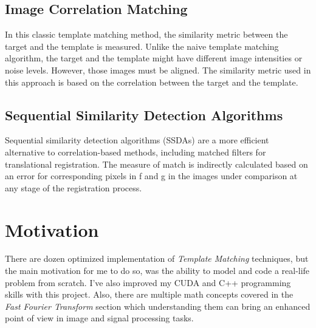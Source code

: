 \subsection{Image Correlation Matching}
In this classic template matching method, the similarity
metric between the target and the template is measured.
Unlike the naive template matching algorithm, the target and the template might have different image intensities or
noise levels. However, those images must be aligned. The
similarity metric used in this approach is based on the
correlation between the target and the template\cite{intro2}.

\subsection{Sequential Similarity Detection Algorithms}
Sequential similarity detection algorithms (SSDAs) are
a more efficient alternative to correlation-based methods,
including matched filters for translational registration. The
measure of match is indirectly calculated based on an error
for corresponding pixels in f and g in the images under
comparison at any stage of the registration process\cite{intro3}.

\section{Motivation}
There are dozen optimized implementation of \textit{Template Matching} techniques, but the main motivation for me to do so, was the ability to model and code a real-life problem from scratch. I've also improved my CUDA and C++ programming skills with this project. Also, there are multiple math concepts covered in the \textit{Fast Fourier Transform} section which understanding them can bring an enhanced point of view in image and signal processing tasks.